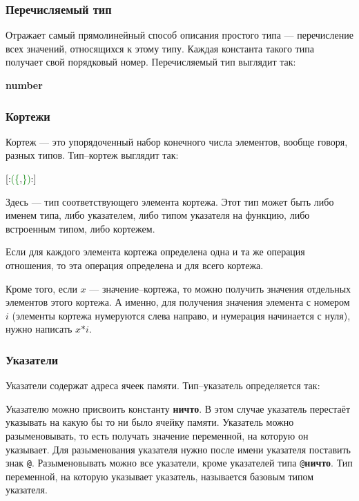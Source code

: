 \documentclass[10pt]{report}
\begin{document}
        \subsubsection{Перечисляемый тип}
Отражает самый прямолинейный способ описания простого типа — перечисление всех значений, относящихся к этому типу. Каждая константа такого типа получает свой порядковый номер. Перечисляемый тип выглядит так: 
\begin{center}
\noindent\textbf{number}
\end{center}

        \subsubsection{Кортежи}
Кортеж --- это упорядоченный набор конечного числа элементов, вообще говоря, разных типов. Тип--кортеж выглядит так:
\begin{center}
\noindent\textcolor{Green}{\textcolor{Black}{[:}(\{\textcolor{Black}{,}\})\textcolor{Black}{:]}}
\end{center} 
   
Здесь \textcolor{Green}{}  --- тип соответствующего элемента кортежа. Этот тип может быть либо именем типа, либо указателем, либо типом указателя на функцию, либо встроенным типом, либо кортежем.

Если для каждого элемента кортежа определена одна и та же операция отношения, то эта операция определена и для всего кортежа.

Кроме того, если $x$ --- значение--кортежа, то можно получить значения отдельных элементов этого кортежа. А именно, для получения значения элемента с номером $i$ (элементы кортежа нумеруются слева направо, и нумерация начинается с нуля), нужно написать $x\texttt{*}i$.

        \subsubsection{Указатели}
Указатели содержат адреса ячеек памяти. Тип--указатель определяется так:
\begin{center}
\noindent\textcolor{Green}{}
\end{center}

Указателю можно присвоить константу \textbf{ничто}. В этом случае указатель перестаёт указывать на какую бы то ни было ячейку памяти. Указатель можно разыменовывать, то есть
получать значение переменной, на которую он указывает. Для разыменования указателя нужно после имени указателя поставить знак \texttt{@}. Разыменовывать можно все указатели,
кроме указателей типа \texttt{@}\textbf{ничто}. Тип переменной, на которую указывает указатель, называется базовым типом указателя.
\end{document}
